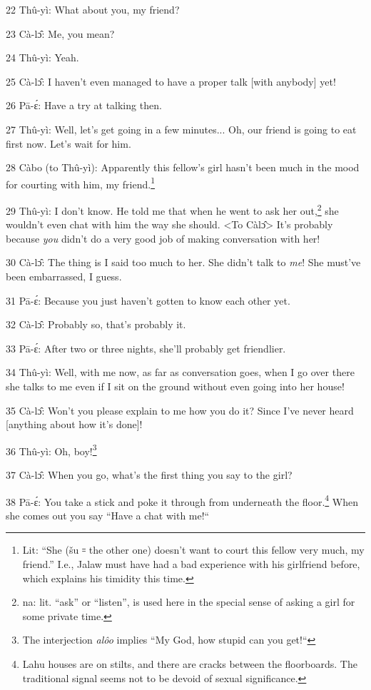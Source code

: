 22 Thû-yì: What about you, my friend?

23 Cà-lɔ̂: Me, you mean?

24 Thû-yì: Yeah.

25 Cà-lɔ̂: I haven't even managed to have a proper talk [with anybody] yet!

26 Pā-ɛ́: Have a try at talking then.

27 Thû-yì: Well, let's get going in a few minutes... Oh, our friend is going
to eat first now. Let's wait for him.

28  Càbo (to Thû-yì): Apparently this fellow's girl hasn't been much in the
mood for courting with him, my friend.\footnote{Lit: ``She (šu ꞊ the other one) doesn't want to court this fellow very much, my friend.'' I.e., Jalaw must have had a bad experience with his girlfriend before, which explains his timidity this time.}

29 Thû-yì: I don't know. He told me that when he went to ask her out,\footnote{na: lit. ``ask'' or ``listen'', is used here in the special sense of asking a girl for some private time.} she
wouldn't even chat with him the way she should. <To Càlɔ̂>
It's probably because \textit{you} didn't do a very good job of making conversation
with her!

30 Cà-lɔ̂: The thing is I said too much to her. She didn't talk to\textit{ me}!
She must've been embarrassed, I guess.

31 Pā-ɛ́: Because you just haven't gotten to know each other yet.

32 Cà-lɔ̂: Probably so, that's probably it.

33 Pā-ɛ́: After two or three nights, she'll probably get friendlier.

34 Thû-yì: Well, with me now, as far as conversation goes, when I go over there
she talks to me even if I sit on the ground without even going into her house!

35 Cà-lɔ̂: Won't you please explain to me how you do it? Since I've never heard
[anything about how it's done]!

36 Thû-yì: Oh, boy!\footnote{The interjection \textit{alôo} implies ``My God, how stupid can you get!``}

37 Cà-lɔ̂: When you go, what's the first thing you say to the girl?

38 Pā-ɛ́: You take a stick and poke it through from underneath the floor.\footnote{Lahu houses are on stilts, and there are cracks between the floorboards. The traditional signal seems not to be devoid of sexual significance.}
When she comes out you say ``Have a chat with me!``

